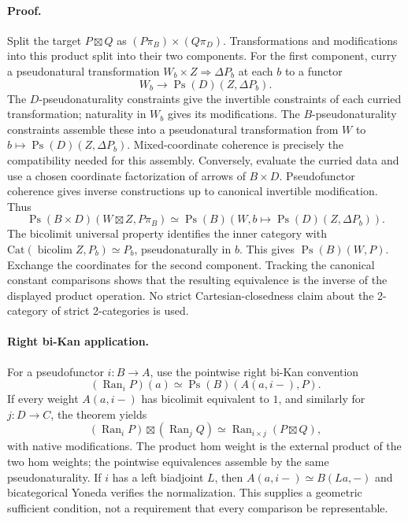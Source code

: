 \documentclass{article}
\begin{document}
\paragraph{Proof.} Split the target $P\boxtimes Q$ as $(P\pi_B)\times(Q\pi_D)$. Transformations and modifications into this product split into their two components. For the first component, curry a pseudonatural transformation $W_b\times Z\Rightarrow\Delta P_b$ at each $b$ to a functor
\[
 W_b\longrightarrow\operatorname{Ps}(D)(Z,\Delta P_b).
\]
The $D$-pseudonaturality constraints give the invertible constraints of each curried transformation; naturality in $W_b$ gives its modifications. The $B$-pseudonaturality constraints assemble these into a pseudonatural transformation from $W$ to $b\mapsto\operatorname{Ps}(D)(Z,\Delta P_b)$. Mixed-coordinate coherence is precisely the compatibility needed for this assembly. Conversely, evaluate the curried data and use a chosen coordinate factorization of arrows of $B\times D$. Pseudofunctor coherence gives inverse constructions up to canonical invertible modification. Thus
\[
 \operatorname{Ps}(B\times D)(W\boxtimes Z,P\pi_B)
 \simeq\operatorname{Ps}(B)(W,b\mapsto\operatorname{Ps}(D)(Z,\Delta P_b)).
\]
The bicolimit universal property identifies the inner category with
$\mathrm{Cat}(\operatorname{bicolim}Z,P_b)\simeq P_b$, pseudonaturally in $b$. This gives $\operatorname{Ps}(B)(W,P)$. Exchange the coordinates for the second component. Tracking the canonical constant comparisons shows that the resulting equivalence is the inverse of the displayed product operation. No strict Cartesian-closedness claim about the 2-category of strict 2-categories is used.

\paragraph{Right bi-Kan application.} For a pseudofunctor $i:B\to A$, use the pointwise right bi-Kan convention
\[
 (\operatorname{Ran}_iP)(a)\simeq
 \operatorname{Ps}(B)(A(a,i-),P).
\]
If every weight $A(a,i-)$ has bicolimit equivalent to $1$, and similarly for $j:D\to C$, the theorem yields
\[
 (\operatorname{Ran}_iP)\boxtimes(\operatorname{Ran}_jQ)
 \simeq\operatorname{Ran}_{i\times j}(P\boxtimes Q),
\]
with native modifications. The product hom weight is the external product of the two hom weights; the pointwise equivalences assemble by the same pseudonaturality. If $i$ has a left biadjoint $L$, then $A(a,i-)\simeq B(La,-)$ and bicategorical Yoneda verifies the normalization. This supplies a geometric sufficient condition, not a requirement that every comparison be representable.
\end{document}
